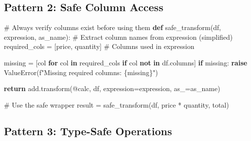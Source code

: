 \documentclass[
  letterpaper,
]{scrbook}
\newenvironment{Shaded}{\begin{snugshade}}{\end{snugshade}}
\newcommand{\CommentTok}[1]{\textcolor[rgb]{0.37,0.37,0.37}{#1}}
\newcommand{\ControlFlowTok}[1]{\textcolor[rgb]{0.00,0.23,0.31}{\textbf{#1}}}
\newcommand{\KeywordTok}[1]{\textcolor[rgb]{0.00,0.23,0.31}{\textbf{#1}}}
\newcommand{\NormalTok}[1]{\textcolor[rgb]{0.00,0.23,0.31}{#1}}
\newcommand{\OperatorTok}[1]{\textcolor[rgb]{0.37,0.37,0.37}{#1}}
\newcommand{\PreprocessorTok}[1]{\textcolor[rgb]{0.68,0.00,0.00}{#1}}
\newcommand{\SpecialCharTok}[1]{\textcolor[rgb]{0.37,0.37,0.37}{#1}}
\newcommand{\SpecialStringTok}[1]{\textcolor[rgb]{0.13,0.47,0.30}{#1}}
\newcommand{\StringTok}[1]{\textcolor[rgb]{0.13,0.47,0.30}{#1}}
\begin{document}
\subsection{Pattern 2: Safe Column
Access}\label{pattern-2-safe-column-access}

\begin{Shaded}
\begin{Highlighting}[]
\CommentTok{\# Always verify columns exist before using them}
\KeywordTok{def}\NormalTok{ safe\_transform(df, expression, as\_name):}
    \CommentTok{\# Extract column names from expression (simplified)}
\NormalTok{    required\_cols }\OperatorTok{=}\NormalTok{ [}\StringTok{\textquotesingle{}price\textquotesingle{}}\NormalTok{, }\StringTok{\textquotesingle{}quantity\textquotesingle{}}\NormalTok{]  }\CommentTok{\# Columns used in expression}
    
\NormalTok{    missing }\OperatorTok{=}\NormalTok{ [col }\ControlFlowTok{for}\NormalTok{ col }\KeywordTok{in}\NormalTok{ required\_cols }\ControlFlowTok{if}\NormalTok{ col }\KeywordTok{not} \KeywordTok{in}\NormalTok{ df.columns]}
    \ControlFlowTok{if}\NormalTok{ missing:}
        \ControlFlowTok{raise} \PreprocessorTok{ValueError}\NormalTok{(}\SpecialStringTok{f"Missing required columns: }\SpecialCharTok{\{}\NormalTok{missing}\SpecialCharTok{\}}\SpecialStringTok{"}\NormalTok{)}
    
    \ControlFlowTok{return}\NormalTok{ add.transform(}\StringTok{\textquotesingle{}@calc\textquotesingle{}}\NormalTok{, df, expression}\OperatorTok{=}\NormalTok{expression, as\_}\OperatorTok{=}\NormalTok{as\_name)}

\CommentTok{\# Use the safe wrapper}
\NormalTok{result }\OperatorTok{=}\NormalTok{ safe\_transform(df, }\StringTok{\textquotesingle{}price * quantity\textquotesingle{}}\NormalTok{, }\StringTok{\textquotesingle{}total\textquotesingle{}}\NormalTok{)}
\end{Highlighting}
\end{Shaded}

\subsection{Pattern 3: Type-Safe
Operations}\label{pattern-3-type-safe-operations}
\end{document}
